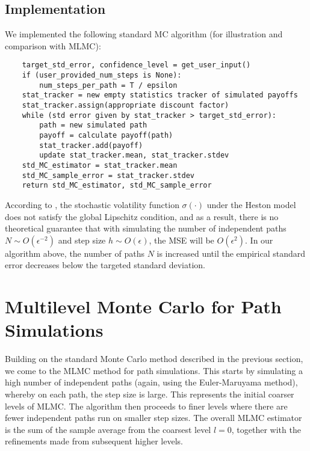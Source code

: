 \documentclass{article}
\begin{document}
\subsection{Implementation}
    We implemented the following standard MC algorithm (for illustration and comparison with MLMC):
    \begin{lstlisting}
	target_std_error, confidence_level = get_user_input()
    if (user_provided_num_steps is None):
        num_steps_per_path = T / epsilon
    stat_tracker = new empty statistics tracker of simulated payoffs
    stat_tracker.assign(appropriate discount factor)
    while (std error given by stat_tracker > target_std_error):
        path = new simulated path
        payoff = calculate payoff(path)
        stat_tracker.add(payoff)
        update stat_tracker.mean, stat_tracker.stdev
    std_MC_estimator = stat_tracker.mean
    std_MC_sample_error = stat_tracker.stdev
    return std_MC_estimator, std_MC_sample_error
    \end{lstlisting}
    
    According to \cite{giles08}, the stochastic volatility function $\sigma(\cdot)$ under the Heston model does not satisfy the global Lipschitz condition, and as a result, there is no theoretical guarantee that with simulating the number of independent paths $N \sim O(\epsilon^{-2})$ and step size $h \sim O(\epsilon)$, the MSE will be $O(\epsilon^2)$. In our algorithm above, the number of paths $N$ is increased until the empirical standard error decreases below the targeted standard deviation. 

\section{Multilevel Monte Carlo for Path Simulations}
	Building on the standard Monte Carlo method described in the previous section, we come to the MLMC method for path simulations. This starts by simulating a high number of independent paths (again, using the Euler-Maruyama method), whereby on each path, the step size is large. This represents the initial coarser levels of MLMC. The algorithm then proceeds to finer levels where there are fewer independent paths run on smaller step sizes. The overall MLMC estimator is the sum of the sample average from the coarsest level $l=0$, together with the refinements made from subsequent higher levels.
	
\end{document}
